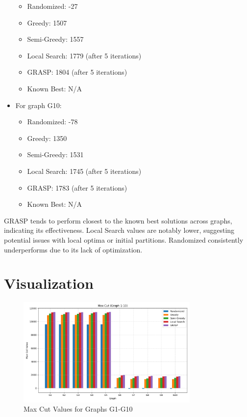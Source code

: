 \documentclass{article}%
\begin{document}
\begin{itemize}
\begin{itemize}
\item Randomized: -27%
\item Greedy: 1507%
\item Semi-Greedy: 1557%
\item Local Search: 1779 (after 5 iterations)%
\item GRASP: 1804 (after 5 iterations)%
\item Known Best: N/A%
\end{itemize}%
\item For graph G10:%
\begin{itemize}%
\item Randomized: -78%
\item Greedy: 1350%
\item Semi-Greedy: 1531%
\item Local Search: 1745 (after 5 iterations)%
\item GRASP: 1783 (after 5 iterations)%
\item Known Best: N/A%
\end{itemize}%
\end{itemize}%
GRASP tends to perform closest to the known best solutions across graphs, indicating its effectiveness. Local Search values are notably lower, suggesting potential issues with local optima or initial partitions. Randomized consistently underperforms due to its lack of optimization.

%
\section{Visualization}%
\label{sec:Visualization}%


\begin{figure}[h!]%
\centering%
\includegraphics[width=0.8\textwidth]{max_cut_plot.png}%
\caption{Max Cut Values for Graphs G1{-}G10}%
\end{figure}

%
\end{document}
